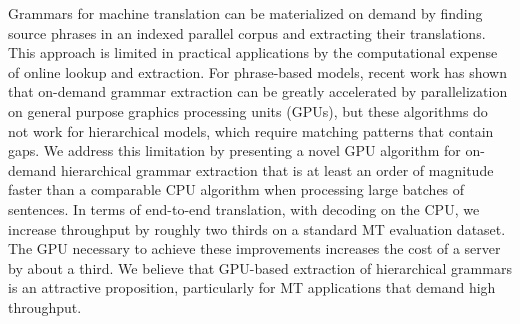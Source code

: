 Grammars for machine translation can be materialized on demand by finding source phrases in an indexed parallel corpus and extracting their translations. This approach is limited in practical applications by the computational expense of online lookup and extraction. For phrase-based models, recent work has shown that on-demand grammar extraction can be greatly accelerated by parallelization on general purpose graphics processing units (GPUs), but these algorithms do not work for hierarchical models, which require matching patterns that contain gaps. We address this limitation by presenting a novel GPU algorithm for on-demand hierarchical grammar extraction that is at least an order of magnitude faster than a comparable CPU algorithm when processing large batches of sentences. In terms of end-to-end translation, with decoding on the CPU, we increase throughput by roughly two thirds on a standard MT evaluation dataset. The GPU necessary to achieve these improvements increases the cost of a server by about a third. We believe that GPU-based extraction of hierarchical grammars is an attractive proposition, particularly for MT applications that demand high throughput.